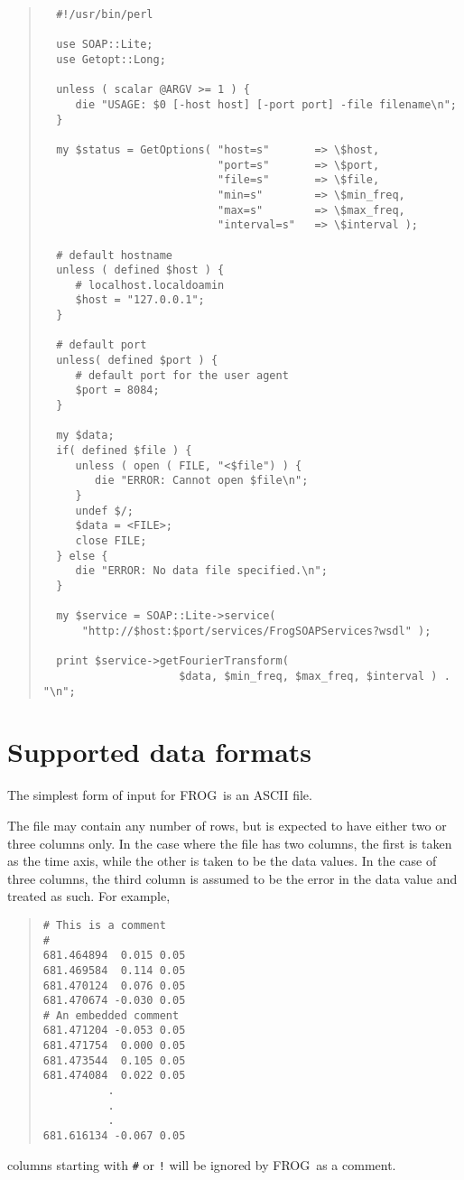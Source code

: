 \documentclass[twoside,11pt]{article}
\newcommand{\xlabel}[1]{}
\renewcommand{\_}{\texttt{\symbol{95}}}
\newcommand{\FROG}{\textsf{FROG}}
\begin{document}
\begin{quote}
\begin{verbatim}
  #!/usr/bin/perl

  use SOAP::Lite;
  use Getopt::Long;

  unless ( scalar @ARGV >= 1 ) {
     die "USAGE: $0 [-host host] [-port port] -file filename\n";
  }
    
  my $status = GetOptions( "host=s"       => \$host,
                           "port=s"       => \$port,
                           "file=s"       => \$file,
                           "min=s"        => \$min_freq,
                           "max=s"        => \$max_freq,
                           "interval=s"   => \$interval );
  
  # default hostname
  unless ( defined $host ) {
     # localhost.localdoamin
     $host = "127.0.0.1";
  } 

  # default port
  unless( defined $port ) {
     # default port for the user agent
     $port = 8084;   
  } 
  
  my $data;
  if( defined $file ) {
     unless ( open ( FILE, "<$file") ) {
        die "ERROR: Cannot open $file\n";
     }
     undef $/;
     $data = <FILE>;
     close FILE;
  } else {
     die "ERROR: No data file specified.\n";
  }
  
  my $service = SOAP::Lite->service(
      "http://$host:$port/services/FrogSOAPServices?wsdl" );
    
  print $service->getFourierTransform( 
                     $data, $min_freq, $max_freq, $interval ) . "\n";
\end{verbatim}
\end{quote}


\section{Supported data formats\xlabel{supported_formats}\label{supported_formats}}

The simplest form of input for \FROG\ is an ASCII file. 

The file may contain any number of rows, but is expected to have either two or three columns only. In the case where the file has two columns, the first is taken as the time axis, while the other is taken to be the data values. In the case of three columns, the third column is assumed to be the error in the data value and treated as such. For example,
\begin{quote}
\begin{verbatim}
# This is a comment
#
681.464894  0.015 0.05
681.469584  0.114 0.05
681.470124  0.076 0.05
681.470674 -0.030 0.05
# An embedded comment
681.471204 -0.053 0.05
681.471754  0.000 0.05
681.473544  0.105 0.05
681.474084  0.022 0.05
          .
          .
          .
681.616134 -0.067 0.05      
\end{verbatim}
\end{quote}
columns starting with \verb+#+ or \verb+!+ will be ignored by \FROG\ as a comment.
\end{document}
